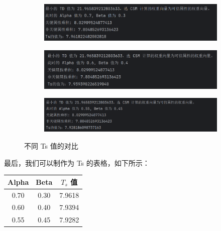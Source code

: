 \documentclass[14pt,a4paper,UTF8,twoside]{article}
\begin{document}
\begin{figure}[H]
    \centering
    \begin{subfigure}{0.55\textwidth}
        \centering
        \includegraphics[width=\textwidth]{img9/Ts.png}
        \label{fig:Ts}
    \end{subfigure}
    
    \vspace{0.25cm} %
    
    \begin{subfigure}{0.55\textwidth}
        \centering
        \includegraphics[width=\textwidth]{img9/Ts2.png}
        \label{fig:Ts2}
    \end{subfigure}
    
    \vspace{0.25cm} %
    
    \begin{subfigure}{0.55\textwidth}
        \centering
        \includegraphics[width=\textwidth]{img9/Ts3.png}
        \label{fig:Ts3}
    \end{subfigure}
    
    \caption{不同 Ts 值的对比}
    \label{fig:Ts_combined}
\end{figure}

最后，我们可以制作为 Ts 的表格，如下所示：

\begin{table}[H]
    \centering
    \begin{tabular}{|c|c|c|}
    \hline
    \textbf{Alpha} & \textbf{Beta} & \textbf{$T_s$ 值} \\ \hline
    0.70 & 0.30 & 7.9618 \\ \hline
    0.60 & 0.40 & 7.9394 \\ \hline
    0.55 & 0.45 & 7.9282 \\ \hline
    \end{tabular}
    \label{tab:alpha_beta_ts}
\end{table}
\end{document}
